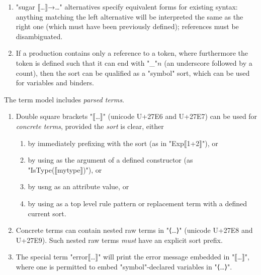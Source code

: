 \documentclass[11pt]{article} %
\begin{document}
\begin{manual}
\begin{enumerate}
  \item "sugar ⟦…⟧→…" alternatives specify equivalent forms for existing syntax: anything matching
    the left alternative will be interpreted the same as the right one (which must have been
    previously defined); references must be disambiguated.

  \item If a production contains only a reference to a token, where furthermore the token is defined
    such that it can end with "_"$n$ (an underscore followed by a count), then the sort can be
    qualified as a "symbol" sort, which can be used for variables and binders.

  \end{enumerate}
\end{manual}

\begin{manual}\label{man:parsed}
  The term model includes \emph{parsed terms}.
  \begin{enumerate}

  \item Double square brackets "⟦…⟧" (unicode U+27E6 and U+27E7) can be used for \emph{concrete
      terms}, provided the \emph{sort} is clear, either
    \begin{enumerate}
    \item by immediately prefixing with the sort (as in "Exp⟦1+2⟧"), or
    \item by using as the argument of a defined constructor (as "IsType(⟦mytype⟧)"), or
    \item by usng as an attribute value, or
    \item by using as a top level rule pattern or replacement term with a defined current sort.
    \end{enumerate}

  \item Concrete terms can contain nested raw terms in "⟨…⟩" (unicode U+27E8 and U+27E9). Such
    nested raw terms \emph{must} have an explicit sort prefix.

  \item The special term "error⟦…⟧" will print the error message embedded in "⟦…⟧", where one is
    permitted to embed "symbol"-declared variables in "⟨…⟩".

  \end{enumerate}

\end{manual}
\end{document}
